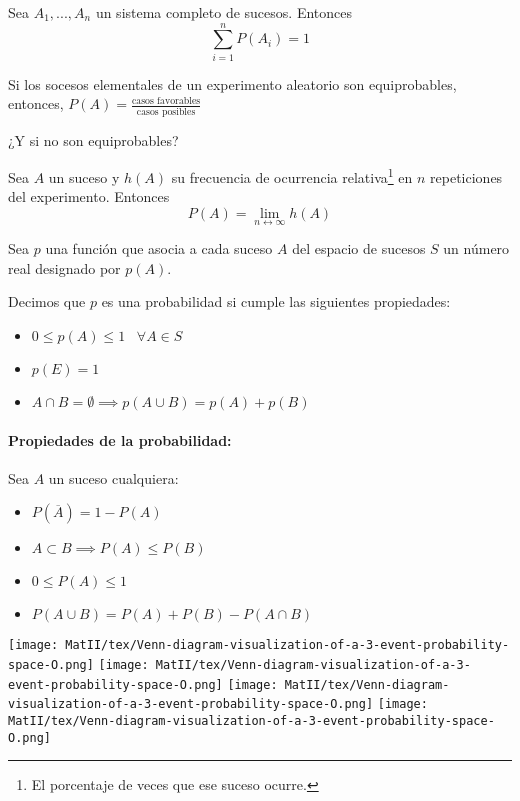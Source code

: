 \begin{prop}Sea $A_1,...,A_n$ un sistema completo de sucesos. Entonces \[\displaystyle\sum_{i=1}^n P(A_i) = 1\]
\end{prop}


\begin{defn}
Si los socesos elementales de un experimento aleatorio son equiprobables, entonces, $P(A) = \frac{\text{casos favorables}}{\text{casos posibles}}$
\end{defn}
\obs ¿Y si no son equiprobables? 

\begin{defn}
Sea $A$ un suceso y $h(A)$ su frecuencia de ocurrencia relativa\footnote{El porcentaje de veces que ese suceso ocurre.} en $n$ repeticiones del experimento. Entonces \[P(A) = \lim_{n\leftrightarrow \infty}h(A)\]
\end{defn}


\begin{defn}
    Sea $p$ una función que asocia a cada suceso $A$ del espacio de sucesos $S$ un número real designado por $p(A)$.
    
    Decimos que $p$ es una probabilidad si cumple las siguientes propiedades:
    \begin{itemize}
        \item $0\leq p(A) \leq 1 \;\;\;\forall A\in S$
        \item $p(E) = 1$
        \item $A\cap B = \emptyset \implies p(A\cup B) = p(A) + p(B)$
    \end{itemize}
\end{defn}

\paragraph{Propiedades de la probabilidad:} Sea $A$ un suceso cualquiera:
\begin{itemize}
    \item $P(\overline{A}) = 1 - P(A)$
    \item $A\subset B \implies P(A) \leq P(B)$
    \item $0\leq P(A) \leq 1$
    \item $P(A\cup B) = P(A) + P(B) - P(A\cap B)$
\end{itemize}

\begin{center}
\texttt{[image: MatII/tex/Venn-diagram-visualization-of-a-3-event-probability-space-O.png]}
\texttt{[image: MatII/tex/Venn-diagram-visualization-of-a-3-event-probability-space-O.png]}
\texttt{[image: MatII/tex/Venn-diagram-visualization-of-a-3-event-probability-space-O.png]}
\texttt{[image: MatII/tex/Venn-diagram-visualization-of-a-3-event-probability-space-O.png]}
\end{center}

